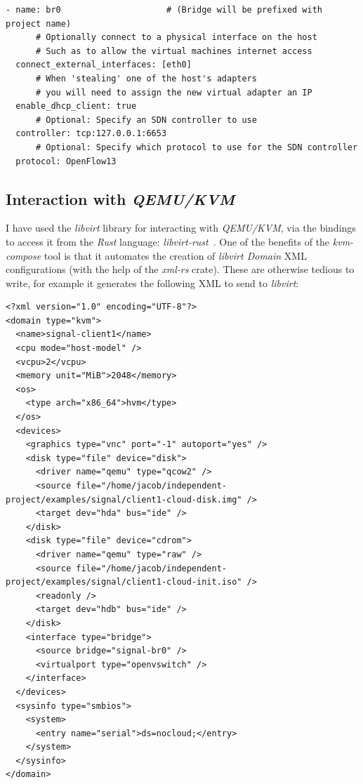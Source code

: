 \documentclass[
    author={Jacob Daniel Halsey},
    supervisor={Prof. Awais Rashid},
    degree={BSc},
    title={Building a Testbed for Evaluating Privacy Enhancing Technologies  (PETs)},
    subtitle={},
    type={software development},
    year={2021}
]{dissertation}
\begin{document}
\begin{verbatim}
- name: br0                     # (Bridge will be prefixed with project name)
      # Optionally connect to a physical interface on the host
      # Such as to allow the virtual machines internet access
  connect_external_interfaces: [eth0]
      # When 'stealing' one of the host's adapters 
      # you will need to assign the new virtual adapter an IP
  enable_dhcp_client: true
      # Optional: Specify an SDN controller to use
  controller: tcp:127.0.0.1:6653
      # Optional: Specify which protocol to use for the SDN controller
  protocol: OpenFlow13
\end{verbatim}

\subsection{Interaction with \emph{QEMU/KVM}}

I have used the \emph{libvirt} library for interacting with \emph{QEMU/KVM}, 
via the bindings to access it from the \emph{Rust} language: \emph{libvirt-rust}~\cite{libvirt_rust}.
One of the benefits of the \emph{kvm-compose} tool is that it automates the creation of \emph{libvirt Domain}
XML configurations (with the help of the \emph{xml-rs} crate). These are otherwise tedious to write, for 
example it generates the following XML to send to \emph{libvirt}:

\begin{verbatim}
<?xml version="1.0" encoding="UTF-8"?>
<domain type="kvm">
  <name>signal-client1</name>
  <cpu mode="host-model" />
  <vcpu>2</vcpu>
  <memory unit="MiB">2048</memory>
  <os>
    <type arch="x86_64">hvm</type>
  </os>
  <devices>
    <graphics type="vnc" port="-1" autoport="yes" />
    <disk type="file" device="disk">
      <driver name="qemu" type="qcow2" />
      <source file="/home/jacob/independent-project/examples/signal/client1-cloud-disk.img" />
      <target dev="hda" bus="ide" />
    </disk>
    <disk type="file" device="cdrom">
      <driver name="qemu" type="raw" />
      <source file="/home/jacob/independent-project/examples/signal/client1-cloud-init.iso" />
      <readonly />
      <target dev="hdb" bus="ide" />
    </disk>
    <interface type="bridge">
      <source bridge="signal-br0" />
      <virtualport type="openvswitch" />
    </interface>
  </devices>
  <sysinfo type="smbios">
    <system>
      <entry name="serial">ds=nocloud;</entry>
    </system>
  </sysinfo>
</domain>
\end{verbatim}
\end{document}
